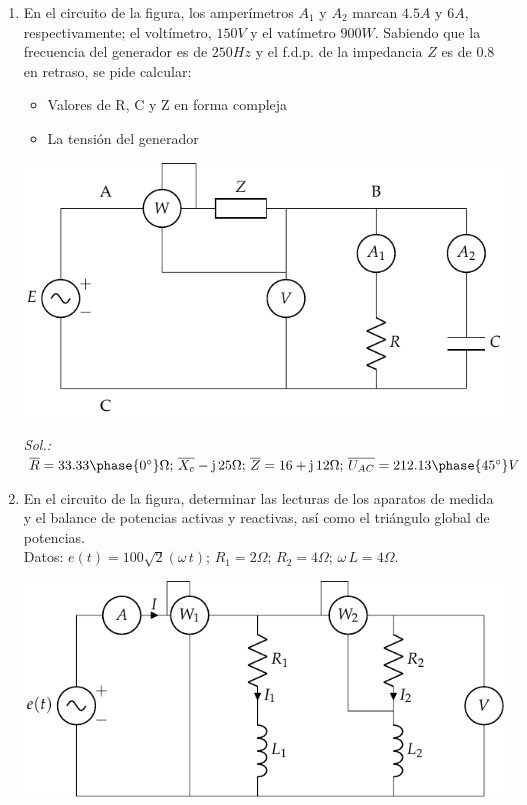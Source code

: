 \begin{enumerate}
\item En el circuito de la figura, los amperímetros $A_1$ y $A_2$
  marcan ${4.5}{A}$ y ${6}{A}$, respectivamente; el voltímetro,
  ${150}{V}$ y el vatímetro ${900}{W}$. Sabiendo que la frecuencia del
  generador es de ${250}{Hz}$ y el f.d.p. de la impedancia $Z$ es de
  0.8 en retraso, se pide calcular:
  \begin{itemize}
  \item Valores de R, C y Z en forma compleja
  \item La tensión del generador
  \end{itemize}
  \begin{center}
    \includegraphics{../figs/ej9_BT2.pdf}
  \end{center}

  \emph{Sol.:
    $\overline{R}=33.33\phase{0^\circ}\Omega;
    \,\overline{X_c}-\mathrm{j}\,25\Omega;\,\overline{Z}=16+\mathrm{j}\,12\Omega;\,\overline{U_{AC}}=212.13\phase{45^\circ}
    V$}

\item En el circuito de la figura, determinar las lecturas de los aparatos de medida y el balance de potencias activas y reactivas, así como el triángulo global de potencias.\\
  Datos: $e(t)=100\sqrt{2}(\omega\,t)$; $R_1=2\Omega$; $R_2=4\Omega$;
  $\omega\,L=4\Omega$.
  \begin{center}
    \includegraphics{../figs/ej11_BT2.pdf}
  \end{center}
    

\end{enumerate}
